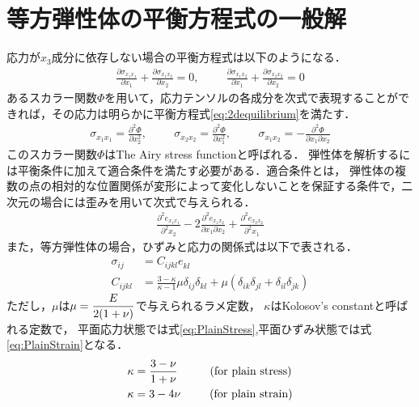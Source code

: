 \section{等方弾性体の平衡方程式の一般解}

応力が$x_{3}$成分に依存しない場合の平衡方程式は以下のようになる．
\begin{align}
	\frac{\partial \sigma_{x_{1}x_{1}}}{\partial x_{1}}+\frac{\partial \sigma_{x_{1}x_{2}}}{\partial x_{2}}=0,\hspace{1cm}
	\frac{\partial \sigma_{x_{1}x_{2}}}{\partial x_{1}}+\frac{\partial \sigma_{x_{2}x_{2}}}{\partial x_{2}}=0
	\label{eq:2dequilibrium}
\end{align}
あるスカラー関数$\Phi$を用いて，応力テンソルの各成分を次式で表現することができれば，その応力は明らかに平衡方程式\eqref{eq:2dequilibrium}を満たす．
\begin{align}
	\sigma_{x_{1}x_{1}}=\frac{\partial^2 \Phi}{\partial x_{2}^2},\hspace{1cm}
	\sigma_{x_{2}x_{2}}=\frac{\partial^2 \Phi}{\partial x_{1}^2},\hspace{1cm}
	\sigma_{x_{1}x_{2}}=-\frac{\partial^2 \Phi}{\partial x_{1} \partial x_{2}}
	\label{eq:Airyxy}
\end{align}
このスカラー関数$\Phi$はThe Airy stress functionと呼ばれる．
弾性体を解析するには平衡条件に加えて適合条件を満たす必要がある．適合条件とは，
弾性体の複数の点の相対的な位置関係が変形によって変化しないことを保証する条件で，二次元の場合には歪みを用いて次式で与えられる．
\begin{align}
	\frac{\partial^2 e_{x_{1}x_{1}}}{\partial^2 x_{2}}
	-2\frac{\partial^2 e_{x_{1}x_{2}}}{\partial x_{1} \partial x_{2}}
	+\frac{\partial^2 e_{x_{2}x_{2}}}{\partial^2 x_{1}}
	\label{eq:Compatibility}
\end{align}
また，等方弾性体の場合，ひずみと応力の関係式は以下で表される．
\begin{align}
	\sigma_{ij}&=C_{ijkl}^{}e_{kl}^{}
	\nonumber
	\\
	C_{ijkl}&=\frac{3-\kappa}{\kappa-1}\mu\delta_{ij}\delta_{kl}
	+\mu(\delta_{ik}\delta_{jl}+\delta_{il}\delta_{jk})
	\label{eq:Constitute}
\end{align}
ただし，$\mu$は$\mu=\displaystyle\frac{E}{2(1+\nu)}$で与えられるラメ定数，
$\kappa$はKolosov's constantと呼ばれる定数で，
平面応力状態では式\eqref{eq:PlainStress},平面ひずみ状態では式\eqref{eq:PlainStrain}となる．
\begin{align}
	\kappa&=\frac{3-\nu}{1+\nu}\hspace{1cm}\text{(for plain stress)}
	\label{eq:PlainStress}
	\\
	\kappa&=3-4\nu\hspace{0.9cm}\text{(for plain strain)}
	\label{eq:PlainStrain}
\end{align}
